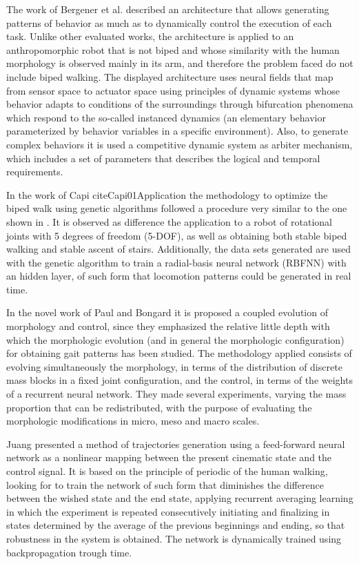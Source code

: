 The work of Bergener et al. \cite{Bergener99Complex} described an
architecture that allows generating patterns of behavior as much as to
dynamically control the execution of each task. Unlike other evaluated
works, the architecture is applied to an anthropomorphic robot that is
not biped and whose similarity with the human morphology is observed
mainly in its arm, and therefore the problem faced do not include
biped walking. The displayed architecture uses neural fields that map
from sensor space to actuator space using principles of dynamic
systems whose behavior adapts to conditions of the surroundings
through bifurcation phenomena which respond to the so-called instanced
dynamics (an elementary behavior parameterized by behavior variables
in a specific environment). Also, to generate complex behaviors it is
used a competitive dynamic system as arbiter mechanism, which includes
a set of parameters that describes the logical and temporal
requirements.


In the work of Capi cite{Capi01Application} the methodology to
optimize the biped walk using genetic algorithms followed a procedure
very similar to the one shown in \cite{Capi02Optimal}. It is observed
as difference the application to a robot of rotational joints with 5
degrees of freedom (5-DOF), as well as obtaining both stable biped
walking and stable ascent of stairs. Additionally, the data sets
generated are used with the genetic algorithm to train a radial-basis
neural network (RBFNN) with an hidden layer, of such form that
locomotion patterns could be generated in real time.


In the novel work of Paul and Bongard \cite{Paul01road} it is proposed
a coupled evolution of morphology and control, since they emphasized
the relative little depth with which the morphologic evolution (and in
general the morphologic configuration) for obtaining gait patterns has
been studied. The methodology applied consists of evolving
simultaneously the morphology, in terms of the distribution of
discrete mass blocks in a fixed joint configuration, and the control,
in terms of the weights of a recurrent neural network. They made
several experiments, varying the mass proportion that can be
redistributed, with the purpose of evaluating the morphologic
modifications in micro, meso and macro scales.


Juang \cite{Juang02Intelligent} presented a method of trajectories
generation using a feed-forward neural network as a nonlinear mapping
between the present cinematic state and the control signal. It is
based on the principle of periodic of the human walking, looking for
to train the network of such form that diminishes the difference
between the wished state and the end state, applying recurrent
averaging learning in which the experiment is repeated consecutively
initiating and finalizing in states determined by the average of the
previous beginnings and ending, so that robustness in the system is
obtained. The network is dynamically trained using backpropagation
trough time.


